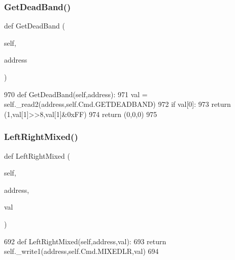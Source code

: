 \subsubsection{\texorpdfstring{Get\+Dead\+Band()}{GetDeadBand()}}
{\footnotesize\ttfamily def Get\+Dead\+Band (\begin{DoxyParamCaption}\item[{}]{self,  }\item[{}]{address }\end{DoxyParamCaption})}


\begin{DoxyCode}
970     \textcolor{keyword}{def }GetDeadBand(self,address):
971         val = self.\_read2(address,self.Cmd.GETDEADBAND)
972         \textcolor{keywordflow}{if} val[0]:
973             \textcolor{keywordflow}{return} (1,val[1]>>8,val[1]&0xFF)
974         \textcolor{keywordflow}{return} (0,0,0)
975         
\end{DoxyCode}
\mbox{\label{classtoxic__hardware_1_1roboclaw__3_1_1Roboclaw_ab1b403df0c19b03fa19fc6e6944b5bac}} 
\subsubsection{\texorpdfstring{Left\+Right\+Mixed()}{LeftRightMixed()}}
{\footnotesize\ttfamily def Left\+Right\+Mixed (\begin{DoxyParamCaption}\item[{}]{self,  }\item[{}]{address,  }\item[{}]{val }\end{DoxyParamCaption})}


\begin{DoxyCode}
692     \textcolor{keyword}{def }LeftRightMixed(self,address,val):
693         \textcolor{keywordflow}{return} self.\_write1(address,self.Cmd.MIXEDLR,val)
694 
\end{DoxyCode}
\mbox{\label{classtoxic__hardware_1_1roboclaw__3_1_1Roboclaw_aae16cc4d3c7c4ec0126729d49ebb92cb}} 
